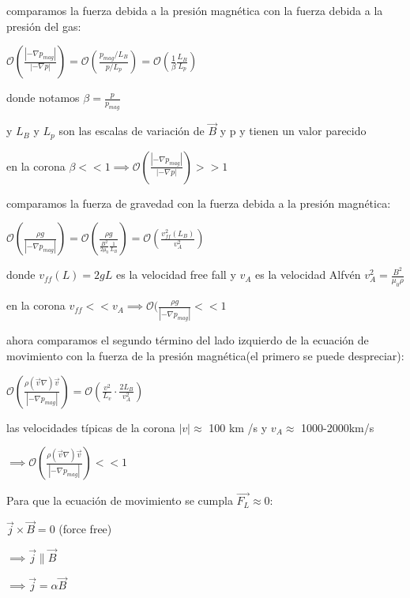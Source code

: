\documentclass[10pt]{book}
\begin{document}
\begin{description}
\item

comparamos la fuerza debida a la presión magnética con la fuerza debida a la presión del gas:


$\mathcal{O}(\frac{|-\nabla p_{mag}|}{|-\nabla p|}) = \mathcal{O}(\frac{p_{mag}/L_B}{p/L_p}) = \mathcal{O}(\frac{1}{\beta} \frac{L_B}{L_p}) $

donde  notamos $\beta = \frac{p}{p_{mag}}$


y $L_B$ y $L_p$ son las escalas de variación de $\vec{B}$ y p y tienen un valor parecido 


en la corona $\beta << 1 \implies \mathcal{O}(\frac{|-\nabla p_{mag}|}{|-\nabla p|}) >> 1$

\item

comparamos la fuerza de gravedad con la fuerza debida a la presión magnética:

$\mathcal{O}(\frac{\rho g}{|-\nabla p_{mag}|}) = \mathcal{O}(\frac{\rho g}{\frac{B^2}{2 \mu_0} \frac{1}{L_B} }) = \mathcal{O}(\frac{v_{ff}^2(L_B)}{v_A^2})$

donde $v_{ff}(L) = 2 g L $ es la velocidad free fall  y $v_A$ es la velocidad Alfvén $v_A^2 = \frac{B^2}{\mu_0 \rho}$


en la corona $v_{ff} << v_A \implies \mathcal{O}(\frac{\rho g}{|-\nabla p_{mag}|} << 1$


\item

ahora comparamos el segundo término del lado izquierdo de la ecuación de movimiento con la fuerza de la presión magnética(el primero se puede despreciar):


$\mathcal{O}(\frac{\rho (\vec{v}\nabla)\vec{v}}{|-\nabla p_{mag}|})  = \mathcal{O}(\frac{v^2}{L_v} \cdot \frac{2 L_B}{v_A^2})$


las velocidades típicas de la corona $|v| \approx$ 100 km /s y $v_A \approx$ 1000-2000km/s

$\implies \mathcal{O}(\frac{\rho (\vec{v}\nabla)\vec{v}}{|-\nabla p_{mag}|}) << 1$


\end{description}

Para que la ecuación de movimiento se cumpla $\vec{F_L} \approx 0$:

$\vec{j}\times \vec{B} = 0$ (force free)

$\implies \vec{j}\parallel \vec{B}$

$\implies \vec{j} = \alpha \vec{B}$
\end{document}
